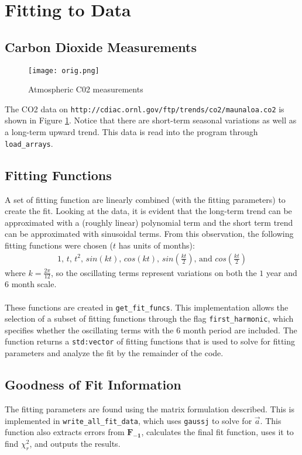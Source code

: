 \documentclass[12pt]{article}
\begin{document}
\section{Fitting to Data}
\subsection{Carbon Dioxide Measurements}
\begin{figure}
  \centering
  \texttt{[image: orig.png]}
  \caption{Atmospheric C02 measurements}
  \label{f1}
\end{figure}
The CO2 data on \texttt{http://cdiac.ornl.gov/ftp/trends/co2/maunaloa.co2} is shown in Figure \ref{f1}. Notice that there are short-term seasonal variations as well as a long-term upward trend. This data is read into the program through \texttt{load\_arrays}.
\subsection{Fitting Functions}
A set of fitting function are linearly combined (with the fitting parameters) to create the fit. Looking at the data, it is evident that the long-term trend can be approximated with a (roughly linear) polynomial term and the short term trend can be approximated with sinusoidal terms. From this observation, the following fitting functions were chosen ($t$ has units of months):
\begin{align*}
1 \text{, } t \text{, } t^2 \text{, }
sin(kt) \text{, } cos(kt) \text{, }
sin(\frac{kt}{2}) \text{, and } cos(\frac{kt}{2})
\end{align*}
where $k = \frac{2\pi}{12}$, so the oscillating terms represent variations on both the $1$ year and $6$ month scale. \\ \\
These functions are created in \texttt{get\_fit\_funcs}. This implementation allows the selection of a subset of fitting functions through the flag \texttt{first\_harmonic}, which specifies whether the oscillating terms with the $6$ month period are included. The function returns a \texttt{std:vector} of fitting functions that is used to solve for fitting parameters and analyze the fit by the remainder of the code.
\subsection{Goodness of Fit Information}
The fitting parameters are found using the matrix formulation described. This is implemented in \texttt{write\_all\_fit\_data}, which uses \texttt{gaussj} to solve for $\vec{a}$. This function also extracts errors from $\mathbf{F_{-1}}$, calculates the final fit function, uses it to find $\chi_r^2$, and outputs the results.
\end{document}

